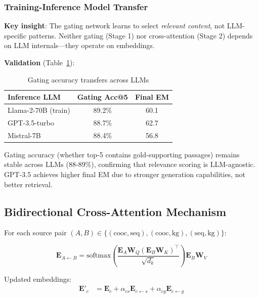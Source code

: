 \documentclass[10pt,twocolumn]{article}
\begin{document}
\subsubsection{Training-Inference Model Transfer}
\label{sec:transfer}

\textbf{Key insight}: The gating network learns to select \textit{relevant content}, not LLM-specific patterns. Neither gating (Stage 1) nor cross-attention (Stage 2) depends on LLM internals—they operate on embeddings.

\textbf{Validation} (Table~\ref{tab:transfer}):

\begin{table}[h]
\centering
\caption{Gating accuracy transfers across LLMs}
\label{tab:transfer}
\small
\begin{tabular}{@{}lcc@{}}
\toprule
\textbf{Inference LLM} & \textbf{Gating Acc@5} & \textbf{Final EM} \\
\midrule
Llama-2-70B (train) & 89.2\% & 60.1 \\
GPT-3.5-turbo & 88.7\% & 62.7 \\
Mistral-7B & 88.4\% & 56.8 \\
\bottomrule
\end{tabular}
\end{table}

Gating accuracy (whether top-5 contains gold-supporting passages) remains stable across LLMs (88-89\%), confirming that relevance scoring is LLM-agnostic. GPT-3.5 achieves higher final EM due to stronger generation capabilities, not better retrieval.



\subsection{Bidirectional Cross-Attention Mechanism}
\label{sec:bidirectional}

For each source pair $(A, B) \in \{(\text{cooc}, \text{seq}), (\text{cooc}, \text{kg}), (\text{seq}, \text{kg})\}$:

\begin{equation}
\mathbf{E}_{A \leftarrow B} = \text{softmax}\left(\frac{\mathbf{E}_A \mathbf{W}_Q (\mathbf{E}_B \mathbf{W}_K)^\top}{\sqrt{d_k}}\right) \mathbf{E}_B \mathbf{W}_V
\end{equation}

Updated embeddings:
\begin{align}
\mathbf{E}'_c &= \mathbf{E}_c + \alpha_{cs}\mathbf{E}_{c \leftarrow s} + \alpha_{cg}\mathbf{E}_{c \leftarrow g}
\end{align}
\end{document}
